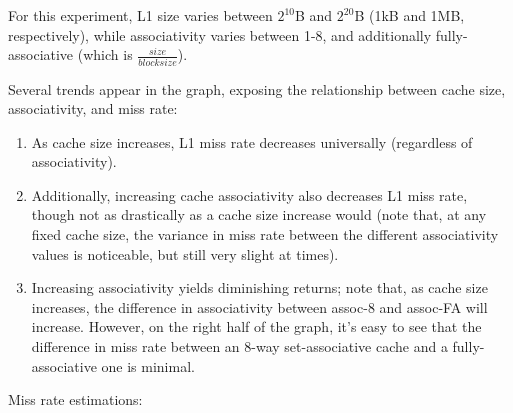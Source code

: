 \documentclass{article}
\begin{document}
    For this experiment, L1 size varies between $2^{10}$B and $2^{20}$B (1kB and 1MB, respectively), while 
    associativity varies between 1-8, and additionally fully-associative (which is $\frac{size}{blocksize}$). 

    Several trends appear in the graph, exposing the relationship between cache size, associativity, and miss rate:
    
    \begin{enumerate}
        \item As cache size increases, L1 miss rate decreases universally (regardless of associativity).
        \item Additionally, increasing cache associativity also decreases L1 miss rate, though not as drastically 
        as a cache size increase would (note that, at any fixed cache size, the variance in miss rate between the different associativity 
        values is noticeable, but still very slight at times).
        \item Increasing associativity yields diminishing returns; note that, as cache size increases, the difference in 
        associativity between assoc-8 and assoc-FA will increase. However, on the right half of the graph, it's easy to 
        see that the difference in miss rate between an 8-way set-associative cache and a fully-associative one is minimal.
    \end{enumerate}

    Miss rate estimations:
\end{document}
